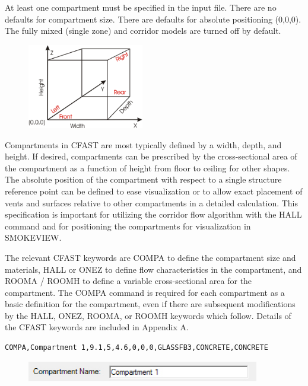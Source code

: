 At least one compartment must be specified in the input file.  There are no defaults for compartment size. There are defaults for absolute positioning (0,0,0). The fully mixed (single zone) and corridor models are turned off by default.

\begin{figure}
  \includegraphics[width=2.0in]{FIGURES/Input_File/CFAST_Coordinates}
\end{figure}

Compartments in CFAST are most typically defined by a width, depth, and height.  If desired, compartments can be prescribed by the cross-sectional area of the compartment as a function of height from floor to ceiling for other shapes. The absolute position of the compartment with respect to a single structure reference point can be defined to ease visualization or to allow exact placement of vents and surfaces relative to other compartments in a detailed calculation. This specification is important for utilizing the corridor flow algorithm with the HALL command and for positioning the compartments for visualization in SMOKEVIEW. 

The relevant CFAST keywords are COMPA to define the compartment size and materials, HALL or ONEZ to define flow characteristics in the compartment, and ROOMA / ROOMH to define a variable cross-sectional area for the compartment. The COMPA command is required for each compartment as a basic definition for the compartment, even if there are subsequent modifications by the HALL, ONEZ, ROOMA, or ROOMH keywords which follow.  Details of the CFAST keywords are included in Appendix A.

\begin{lstlisting}
COMPA,Compartment 1,9.1,5,4.6,0,0,0,GLASSFB3,CONCRETE,CONCRETE
\end{lstlisting}

\begin{figure}[h!]
\begin{center}
\includegraphics[width=4.0in]{FIGURES/Input_File/Compartment_Name}
\end{center}
\end{figure}

